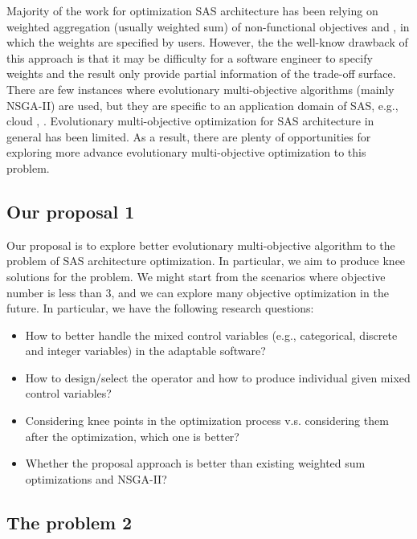 \documentclass[DIV15,a4paper]{scrartcl}
\begin{document}
Majority of the work for optimization SAS architecture has been relying on weighted aggregation (usually weighted sum) of non-functional objectives \cite{Elkhodary:2010} and \cite{Esfahani:2011}, in which the weights are specified by users. However, the the well-know drawback of this approach is that it may be difficulty for a software engineer to specify weights and the result only provide partial information of the trade-off surface. There are few instances where evolutionary multi-objective algorithms (mainly NSGA-II) are used, but they are specific to an application domain of SAS, e.g., cloud \cite{2014-eplison-GA-weigh-h-scaling-2014}, \cite{E3-R-extended}. Evolutionary multi-objective optimization for SAS architecture in general has been limited. As a result, there are plenty of opportunities for exploring more advance evolutionary multi-objective optimization to this problem.

\subsection{Our proposal 1}

Our proposal is to explore better evolutionary multi-objective algorithm to the problem of SAS architecture optimization. In particular, we aim to produce knee solutions for the problem. We might start from the scenarios where objective number is less than 3, and we can explore many objective optimization in the future. In particular, we have the following research questions:

\begin{itemize}

\item How to better handle the mixed control variables (e.g., categorical, discrete and integer variables) in the adaptable software?

\item How to design/select the operator and how to produce individual given mixed control variables?

\item Considering knee points in the optimization process v.s. considering them after the optimization, which one is better?

\item Whether the proposal approach is better than existing weighted sum optimizations and NSGA-II?

\end{itemize}


\subsection{The problem 2}
\end{document}
